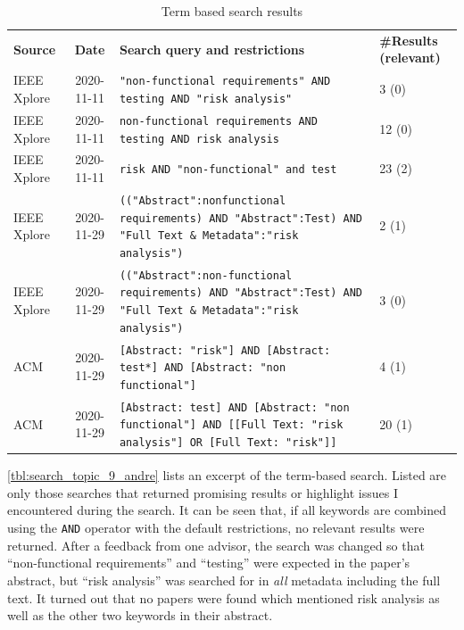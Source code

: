 \begin{small}
	\centering
	\begin{longtable}[h]{p{}|c|p{}|p{}}
		\caption{Term based search results}
		\label{tbl:search_topic_9_andre}
		\setlength{\tabcolsep}{1em}\\    %
		\hline
		\textbf{Source} & \textbf{Date} & \textbf{Search query and restrictions} & \textbf{\#Results (relevant)} \\
		
		\hline
		IEEE Xplore & 2020-11-11 & \texttt{"{}non-functional requirements"{} AND testing AND "{}risk analysis"{}} & 3 (0) \\
		
		\hline
		IEEE Xplore & 2020-11-11 & \texttt{non-functional requirements AND testing AND risk analysis} & 12 (0) \\
		
		\hline
		IEEE Xplore & 2020-11-11 & \texttt{risk AND "non-functional" and test} & 23 (2) \\
		
		\hline
		IEEE Xplore & 2020-11-29 & \texttt{(("{}Abstract"{}:nonfunctional requirements) AND "{}Abstract"{}:Test) AND "Full Text \& Metadata":"{}risk analysis"{})} & 2 (1) \\
		
		\hline
		IEEE Xplore & 2020-11-29 & \texttt{(("{}Abstract"{}:non-functional requirements) AND "{}Abstract"{}:Test) AND "Full Text \& Metadata":"{}risk analysis"{})} & 3 (0) \\
		
		\hline
		ACM & 2020-11-29 & \texttt{[Abstract: "{}risk"{}] AND [Abstract: test*] AND [Abstract: "{}non functional"{}]} & 4 (1) \\
		
		\hline
		ACM & 2020-11-29 & \texttt{[Abstract: test] AND [Abstract: "{}non functional"{}] AND [[Full Text: "{}risk analysis"{}] OR [Full Text: "{}risk"{}]]} & 20 (1) \\
		\hline
	\end{longtable}
\end{small}

\autoref{tbl:search_topic_9_andre} lists an excerpt of the term-based search.
Listed are only those searches that returned promising results or highlight issues I encountered during the search.
It can be seen that, if all keywords are combined using the \texttt{AND} operator with the default restrictions, no relevant results were returned.
After a feedback from one advisor, the search was changed so that \enquote{non-functional requirements} and \enquote{testing} were expected in the paper's abstract, but \enquote{risk \newpage analysis} was searched for in \textit{all} metadata including the full text.
It turned out that no papers were found which mentioned risk analysis as well as the other two keywords in their abstract.

